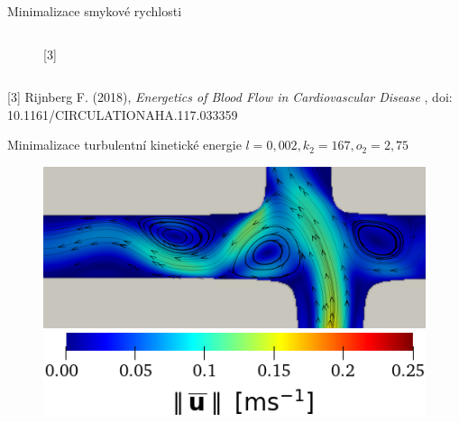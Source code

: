 \documentclass[aspectratio=169,xcolor=dvipsnames]{beamer}
\begin{document}
\begin{frame}{Minimalizace smykové rychlosti}
\begin{columns}
\begin{column}{.35\textwidth}
\begin{figure}
				\caption{[3]}		
			\end{figure}
		\end{column}
	\end{columns}	
	\vspace{-1mm}
	\tiny{[3] Rijnberg F. (2018), \textit{Energetics of Blood Flow in Cardiovascular
			Disease
		}, doi: 10.1161/CIRCULATIONAHA.117.033359}
\end{frame}
\begin{frame}{Minimalizace turbulentní kinetické energie}
	$ l = 0{,}002, k_2 = 167, o_2 = 2{,}75$
	\begin{figure}[H]
		\centering
		\vspace{3mm}
		\includegraphics[width=0.75
		\textwidth]{Images/tcpc_tke_veloc_a3.png}\\[11pt]
		\includegraphics[width=0.37	\textwidth]{Images/tcpc_dotgamma_veloc_legenda.png}
	\end{figure}
\end{frame}
\end{document}

